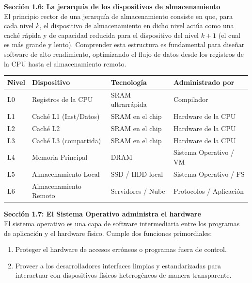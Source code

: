 \documentclass[11pt, a4paper]{article}
\begin{document}
\noindent\textbf{Sección 1.6: La jerarquía de los dispositivos de almacenamiento}\\[0.5em]
El principio rector de una jerarquía de almacenamiento consiste en que, para cada nivel $k$, el dispositivo de almacenamiento en dicho nivel actúa como una caché rápida y de capacidad reducida para el dispositivo del nivel $k+1$ (el cual es más grande y lento). Comprender esta estructura es fundamental para diseñar software de alto rendimiento, optimizando el flujo de datos desde los registros de la CPU hasta el almacenamiento remoto.

\begin{center}
\small
\begin{tabular}{llll}
\toprule
\textbf{Nivel} & \textbf{Dispositivo} & \textbf{Tecnología} & \textbf{Administrado por} \\
\midrule
L0 & Registros de la CPU & SRAM ultrarrápida & Compilador \\
L1 & Caché L1 (Inst/Datos) & SRAM en el chip & Hardware de la CPU \\
L2 & Caché L2 & SRAM en el chip & Hardware de la CPU \\
L3 & Caché L3 (compartida) & SRAM en el chip & Hardware de la CPU \\
L4 & Memoria Principal & DRAM & Sistema Operativo / VM \\
L5 & Almacenamiento Local & SSD / HDD local & Sistema Operativo / FS \\
L6 & Almacenamiento Remoto & Servidores / Nube & Protocolos / Aplicación \\
\bottomrule
\end{tabular}
\end{center}

\noindent\textbf{Sección 1.7: El Sistema Operativo administra el hardware}\\[0.5em]
El sistema operativo es una capa de software intermediaria entre los programas de aplicación y el hardware físico. Cumple dos funciones primordiales:
\begin{enumerate}
  \item Proteger el hardware de accesos erróneos o programas fuera de control.
  \item Proveer a los desarrolladores interfaces limpias y estandarizadas para interactuar con dispositivos físicos heterogéneos de manera transparente.
\end{enumerate}
\end{document}
